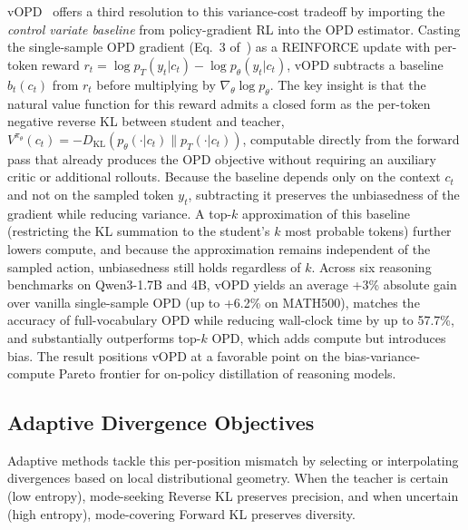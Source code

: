 \documentclass{article} %
\newcommand{\KL}{D_{\mathrm{KL}}}
\newcommand{\ptheta}{p_\theta}
\newcommand{\pteacher}{p_T}
\begin{document}
vOPD~\citep{oh2026vopd} offers a third resolution to this variance-cost tradeoff by importing the \emph{control variate baseline} from policy-gradient RL into the OPD estimator. Casting the single-sample OPD gradient (Eq.~3 of~\citealp{oh2026vopd}) as a REINFORCE update with per-token reward $r_t = \log \pteacher(y_t|c_t) - \log \ptheta(y_t|c_t)$, vOPD subtracts a baseline $b_t(c_t)$ from $r_t$ before multiplying by $\nabla_\theta \log \ptheta$. The key insight is that the natural value function for this reward admits a closed form as the per-token negative reverse KL between student and teacher, $V^{\pi_\theta}(c_t) = -\KL(\ptheta(\cdot|c_t) \parallel \pteacher(\cdot|c_t))$, computable directly from the forward pass that already produces the OPD objective without requiring an auxiliary critic or additional rollouts. Because the baseline depends only on the context $c_t$ and not on the sampled token $y_t$, subtracting it preserves the unbiasedness of the gradient while reducing variance. A top-$k$ approximation of this baseline (restricting the KL summation to the student's $k$ most probable tokens) further lowers compute, and because the approximation remains independent of the sampled action, unbiasedness still holds regardless of $k$. Across six reasoning benchmarks on Qwen3-1.7B and 4B, vOPD yields an average +3\% absolute gain over vanilla single-sample OPD (up to +6.2\% on MATH500), matches the accuracy of full-vocabulary OPD while reducing wall-clock time by up to 57.7\%, and substantially outperforms top-$k$ OPD, which adds compute but introduces bias. The result positions vOPD at a favorable point on the bias-variance-compute Pareto frontier for on-policy distillation of reasoning models.

\subsection{Adaptive Divergence Objectives}
\label{subsec:adaptive_div}

Adaptive methods tackle this per-position mismatch by selecting or interpolating divergences based on local distributional geometry. When the teacher is certain (low entropy), mode-seeking Reverse KL preserves precision, and when uncertain (high entropy), mode-covering Forward KL preserves diversity.
\end{document}
